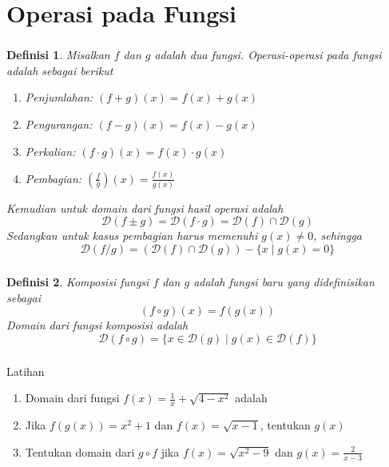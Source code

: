 \documentclass[aspectratio=169]{beamer}
\newtheorem{definisi}{Definisi}
\theoremstyle{definition}
\newcommand{\dom}{\mathcal{D}}
\begin{document}
    \section{Operasi pada Fungsi}
    \begin{frame}
        \frametitle{\insertsection}
        \begin{definisi}
            Misalkan $f$ dan $g$ adalah dua fungsi. Operasi-operasi pada fungsi adalah sebagai berikut
            \begin{enumerate}[label=(\arabic*)]
                \item Penjumlahan: $(f+g)(x)=f(x)+g(x)$
                \item Pengurangan: $(f-g)(x)=f(x)-g(x)$
                \item Perkalian: $(f\cdot g)(x)=f(x)\cdot g(x)$
                \item Pembagian: $\left(\displaystyle\frac{f}{g}\right)(x)=\displaystyle\frac{f(x)}{g(x)}$
            \end{enumerate}
            Kemudian untuk domain dari fungsi hasil operasi adalah \[\dom(f\pm g)=\dom(f\cdot g)=\dom(f)\cap\dom(g)\]
            Sedangkan untuk kasus pembagian harus memenuhi $g(x)\ne 0$, sehingga
            \[\dom\left(f/g\right)=(\dom(f)\cap\dom(g)) - \{x\mid g(x)=0\}\]
        \end{definisi}
    \end{frame}

    \begin{frame}
        \frametitle{\insertsection}
        \begin{definisi}
            Komposisi fungsi $f$ dan $g$ adalah fungsi baru yang didefinisikan sebagai 
            \[(f\circ g)(x)=f(g(x))\]
            Domain dari fungsi komposisi adalah 
            \[\dom(f\circ g)=\{x\in\dom(g)\mid g(x)\in\dom(f)\}\]
        \end{definisi}
    \end{frame}

    \begin{frame}
        \frametitle{\insertsection}
        \begin{exampleblock}{Latihan}
            \begin{enumerate} [label=(\arabic*)]
                \item Domain dari fungsi $\displaystyle f(x)=\frac{1}{x}+\sqrt{4-x^2}$ adalah
                \item Jika $f(g(x))=x^2+1$ dan $f(x)=\sqrt{x-1}$, tentukan $g(x)$
                \item Tentukan domain dari $g\circ f$ jika $f(x)=\sqrt{x^2-9}$ dan $\displaystyle g(x)=\frac{2}{x-3}$
            \end{enumerate}
        \end{exampleblock}
    \end{frame}
\end{document}
